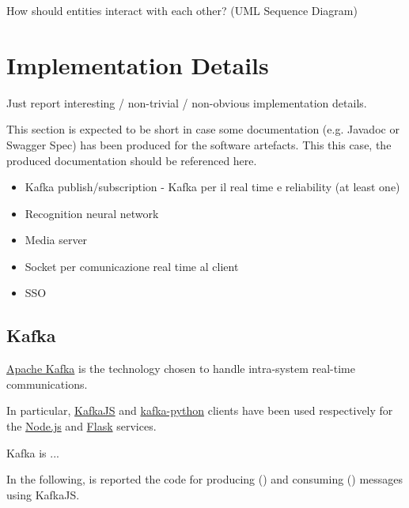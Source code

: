 \documentclass{scrartcl}
\begin{document}
    How should entities interact with each other?
%
    (UML Sequence Diagram)


    \section{Implementation Details}

    Just report interesting / non-trivial / non-obvious implementation details.

    This section is expected to be short in case some documentation (e.g. Javadoc or Swagger Spec) has been produced for the software artefacts.
%
    This this case, the produced documentation should be referenced here.

    \begin{itemize}
        \item Kafka publish/subscription - Kafka per il real time e reliability (at least one)
        \item Recognition neural network
        \item Media server
        \item Socket per comunicazione real time al client
        \item SSO
    \end{itemize}

    \subsection{Kafka}

    \href{https://kafka.apache.org}{Apache Kafka} is the technology chosen to handle intra-system real-time communications.

    In particular, \href{https://kafka.js.org}{KafkaJS} and \href{https://kafka-python.readthedocs.io/en/master/}{kafka-python} clients
    have been used respectively for the \href{https://nodejs.org/en}{Node.js} and \href{https://flask.palletsprojects.com/en/3.0.x/}{Flask} services.

    Kafka is ...

    In the following, is reported the code for producing () and consuming () messages using KafkaJS.

    

    
\end{document}

